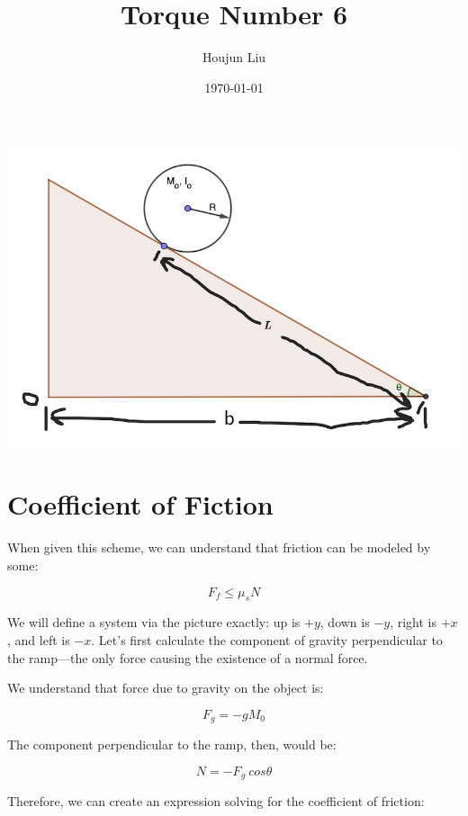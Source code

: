 \documentclass[letterpaper]{article}
\author{Houjun Liu}
\date{\today}
\title{Torque Number 6}
\renewcommand{\tableofcontents}{}
\renewcommand\maketitle{}
\begin{document}
\maketitle
\tableofcontents

\begin{center}
\includegraphics[width=.9\linewidth]{2022-03-21_21-24-06_screenshot.png}
\end{center}

\section{Coefficient of Fiction}
\label{sec:org04655df}
When given this scheme, we can understand that friction can be modeled by some:

\begin{equation}
   F_f \leq \mu_s N 
\end{equation}

We will define a system via the picture exactly: up is \(+y\), down is \(-y\), right is \(+x\), and left is \(-x\). Let's first calculate the component of gravity perpendicular to the ramp---the only force causing the existence of a normal force.

We understand that force due to gravity on the object is:

\begin{equation}
   F_g = -gM_0 
\end{equation}

The component perpendicular to the ramp, then, would be:

\begin{equation}
   N=-F_g\ cos\theta
\end{equation}

Therefore, we can create an expression solving for the coefficient of friction:
\end{document}
